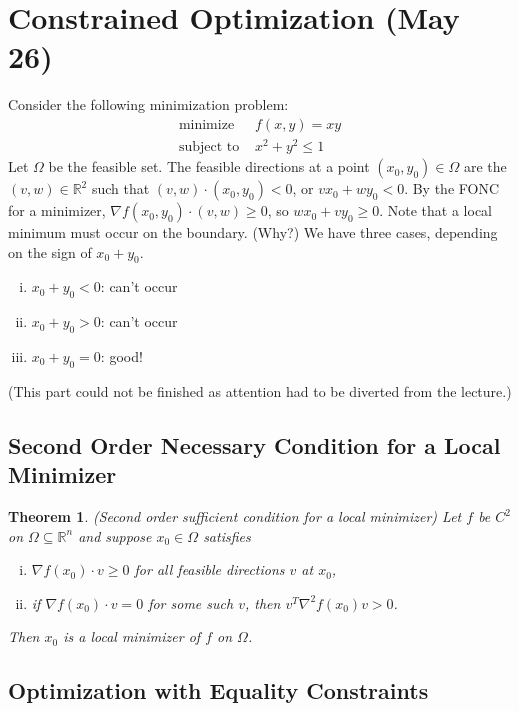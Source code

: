\documentclass[11pt]{book}
\newcommand{\R}{\mathbb{R}}
\newtheorem{theorem}{Theorem}[subsection]
\begin{document}
\newpage
\section{Constrained Optimization (May 26)}

Consider the following minimization problem:
\begin{align*}
\text{minimize } &f(x,y) = xy \\
\text{subject to } &x^2 + y^2 \leq 1
\end{align*}
Let $\Omega$ be the feasible set. The feasible directions at a point $(x_0, y_0) \in \Omega$ are the $(v, w) \in \R^2$ such that $(v, w) \cdot (x_0, y_0) < 0$, or $vx_0 + wy_0 < 0$. By the FONC for a minimizer, $\nabla f(x_0, y_0) \cdot (v, w) \geq 0$, so $wx_0 + vy_0 \geq 0$. Note that a local minimum must occur on the boundary. (Why?) We have three cases, depending on the sign of $x_0 + y_0$.
\begin{enumerate}[(i)]
\item $x_0 + y_0 < 0$: can't occur
\item $x_0 + y_0 > 0$: can't occur
\item $x_0 + y_0 = 0$: good!
\end{enumerate}
(This part could not be finished as attention had to be diverted from the lecture.)

\subsection{Second Order Necessary Condition for a Local Minimizer}

\begin{theorem}
(Second order sufficient condition for a local minimizer) Let $f$ be $C^2$ on $\Omega \subseteq \R^n$ and suppose $x_0 \in \Omega$ satisfies
\begin{enumerate}[(i)]
\item $\nabla f(x_0) \cdot v \geq 0$ for all feasible directions $v$ at $x_0$,
\item if $\nabla f(x_0) \cdot v = 0$ for some such $v$, then $v^T \nabla^2 f(x_0) v > 0$.
\end{enumerate}
Then $x_0$ is a local minimizer of $f$ on $\Omega$.
\end{theorem}

\subsection{Optimization with Equality Constraints}
\end{document}
